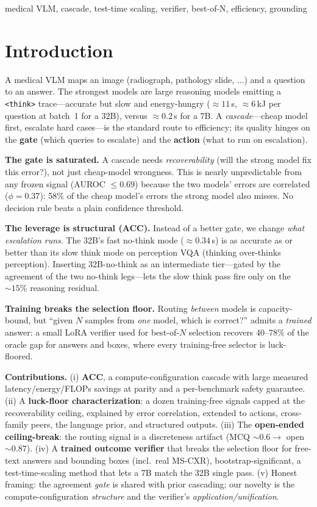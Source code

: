 \documentclass[conference]{IEEEtran}
\begin{document}
\begin{IEEEkeywords}
medical VLM, cascade, test-time scaling, verifier, best-of-N, efficiency, grounding
\end{IEEEkeywords}

\section{Introduction}
A medical VLM maps an image (radiograph, pathology slide, $\ldots$) and a question to an answer. The strongest models are large reasoning models emitting a \texttt{<think>} trace---accurate but slow and energy-hungry (${\approx}11$\,s, ${\approx}6$\,kJ per question at batch~1 for a 32B), versus ${\approx}0.2$\,s for a 7B. A \emph{cascade}---cheap model first, escalate hard cases---is the standard route to efficiency; its quality hinges on the \textbf{gate} (which queries to escalate) and the \textbf{action} (what to run on escalation).

\textbf{The gate is saturated.} A cascade needs \emph{recoverability} (will the strong model fix this error?), not just cheap-model wrongness. This is nearly unpredictable from any frozen signal (AUROC $\le 0.69$) because the two models' errors are correlated ($\phi{=}0.37$): 58\% of the cheap model's errors the strong model also misses. No decision rule beats a plain confidence threshold.

\textbf{The leverage is structural (ACC).} Instead of a better gate, we change \emph{what escalation runs}. The 32B's fast no-think mode (${\approx}0.34$\,s) is as accurate as or better than its slow think mode on perception VQA (thinking over-thinks perception). Inserting 32B-no-think as an intermediate tier---gated by the agreement of the two no-think legs---lets the slow think pass fire only on the ${\sim}15\%$ reasoning residual.

\textbf{Training breaks the selection floor.} Routing \emph{between} models is capacity-bound, but ``given $N$ samples from \emph{one} model, which is correct?'' admits a \emph{trained} answer: a small LoRA verifier used for best-of-$N$ selection recovers 40--78\% of the oracle gap for answers and boxes, where every training-free selector is luck-floored.

\textbf{Contributions.} (i) \textbf{ACC}, a compute-configuration cascade with large measured latency/energy/FLOPs savings at parity and a per-benchmark safety guarantee. (ii) A \textbf{luck-floor characterization}: a dozen training-free signals capped at the recoverability ceiling, explained by error correlation, extended to actions, cross-family peers, the language prior, and structured outputs. (iii) The \textbf{open-ended ceiling-break}: the routing signal is a discreteness artifact (MCQ ${\sim}0.6\to$ open ${\sim}0.87$). (iv) A \textbf{trained outcome verifier} that breaks the selection floor for free-text answers and bounding boxes (incl.\ real MS-CXR), bootstrap-significant, a test-time-scaling method that lets a 7B match the 32B single pass. (v) Honest framing: the agreement \emph{gate} is shared with prior cascading; our novelty is the compute-configuration \emph{structure} and the verifier's \emph{application/unification}.
\end{document}
